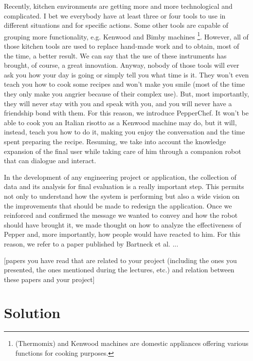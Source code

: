 \documentclass[11pt]{article}
\begin{document}
Recently, kitchen environments are getting more and more technological and complicated. I bet we everybody have at least three or four tools to use in different situations and for specific actions. Some other tools are capable of grouping more functionality, e.g. Kenwood and Bimby machines \footnote{(Thermomix) and Kenwood machines are domestic appliances offering various functions for cooking purposes.}. However, all of those kitchen tools are used to replace hand-made work and to obtain, most of the time, a better result. We can say that the use of these instruments has brought, of course, a great innovation. Anyway, nobody of those tools will ever ask you how your day is going or simply tell you what time is it. They won't even teach you how to cook some recipes and won't make you smile (most of the time they only make you angrier because of their complex use). But, most importantly, they will never stay with you and speak with you, and you will never have a friendship bond with them. For this reason, we introduce PepperChef. It won't be able to cook you an Italian risotto as a Kenwood machine may do, but it will, instead, teach you how to do it, making you enjoy the conversation and the time spent preparing the recipe. Resuming, we take into account the knowledge expansion of the final user while taking care of him through a companion robot that can dialogue and interact.  

In the development of any engineering project or application, the collection of data and its analysis for final evaluation is a really important step. This permits not only to understand how the system is performing but also a wide vision on the improvements that should be made to redesign the application. Once we reinforced and confirmed the message we wanted to convey and how the robot should have brought it, we made thought on how to analyze the effectiveness of Pepper and, more importantly, how people would have reacted to him. For this reason, we refer to a paper published by Bartneck et al. \cite{bartneck} ...

[papers  you have read that are related to your project (including the ones you presented, the ones mentioned during the lectures, etc.) and relation between these papers and your project]

\newpage
\section{Solution}\label{cha:sol}
\end{document}
